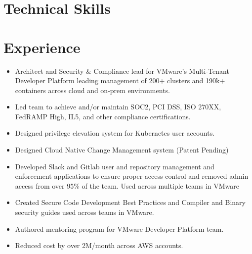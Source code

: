 \documentclass[10pt,a4paper,roman]{moderncv} %
\begin{document}


\makecvtitle %


\section{Technical Skills}




\section{Experience}
{
\begin{itemize}
\item Architect and Security \& Compliance lead for VMware's Multi-Tenant Developer Platform leading management of 200+ clusters and 190k+ containers across cloud and on-prem environments.
\item Led team to achieve and/or maintain SOC2, PCI DSS, ISO 270XX, FedRAMP High, IL5, and other compliance certifications.
\item Designed privilege elevation system for Kubernetes user accounts.
\item Designed Cloud Native Change Management system (Patent Pending)
\item Developed Slack and Gitlab user and repository management and enforcement applications to ensure proper access control and removed admin access from over 95\% of the team. Used across multiple teams in VMware
\item Created Secure Code Development Best Practices and Compiler and Binary security guides used across teams in VMware.
\item Authored mentoring program for VMware Developer Platform team.
\item Reduced cost by over 2M/month across AWS accounts.
\end{itemize}
}
\end{document}
